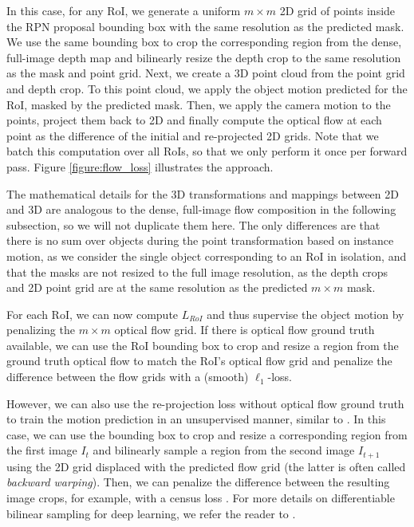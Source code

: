 In this case, for any RoI,
we generate a uniform $m \times m$ 2D grid of points inside the RPN proposal bounding box
with the same resolution as the predicted mask.
We use the same bounding box
to crop the corresponding region from the dense, full-image depth map
and bilinearly resize the depth crop to the same resolution as the mask and point
grid.
Next, we create a 3D point cloud from the point grid and depth crop. To this point cloud, we
apply the object motion predicted for the RoI, masked by the predicted mask.
Then, we apply the camera motion to the points, project them back to 2D
and finally compute the optical flow at each point as the difference of the initial and re-projected 2D grids.
Note that we batch this computation over all RoIs, so that we only perform
it once per forward pass.
Figure \ref{figure:flow_loss} illustrates the approach.

The mathematical details for the 3D transformations and mappings between 2D and 3D are analogous to the
dense, full-image flow composition in the following subsection, so we will not
duplicate them here. The only differences are that there is no sum over objects during
the point transformation based on instance motion, as we consider the single object
corresponding to an RoI in isolation, and that the masks are not resized to the
full image resolution, as
the depth crops and 2D point grid are at the same resolution as the predicted
$m \times m$ mask.

For each RoI, we can now compute $L_{RoI}$ and thus supervise the object motion
by penalizing the $m \times m$ optical flow grid.
If there is optical flow ground truth available, we can use the RoI bounding box to
crop and resize a region from the ground truth optical flow to match the RoI's
optical flow grid and penalize the difference between the flow grids with a (smooth) $\ell_1$-loss.

However, we can also use the re-projection loss without optical flow ground truth
to train the motion prediction in an unsupervised manner, similar to \cite{SfmNet}.
In this case, we can use the bounding box to crop and resize a corresponding region
from the first image $I_t$ and bilinearly sample a region from the second image $I_{t+1}$
using the 2D grid displaced with the predicted flow grid (the latter is often called \emph{backward warping}).
Then, we can penalize the difference
between the resulting image crops, for example, with a census loss \cite{CensusTerm,UnFlow}.
For more details on differentiable bilinear sampling for deep learning, we refer the reader to
\cite{STN}.

